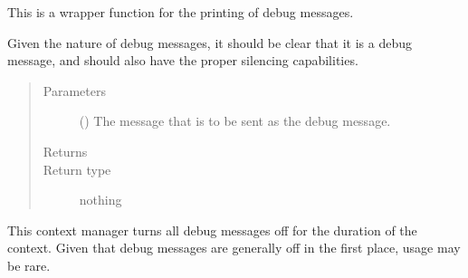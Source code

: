 \documentclass[letterpaper,10pt,english]{sphinxmanual}
\begin{document}

\begin{fulllineitems}
\label{\detokenize{python_docstrings/IfA_Smeargle.meta.errors:IfA_Smeargle.meta.errors.smeargle_debug_message}}
This is a wrapper function for the printing of debug messages.

Given the nature of debug messages, it should be clear that it is a debug
message, and should also have the proper silencing capabilities.
\begin{quote}\begin{description}
\item[{Parameters}] \leavevmode
{} () \textendash{} The message that is to be sent as the debug message.

\item[{Returns}] \leavevmode


\item[{Return type}] \leavevmode
nothing

\end{description}\end{quote}

\end{fulllineitems}


\begin{fulllineitems}
\label{\detokenize{python_docstrings/IfA_Smeargle.meta.errors:IfA_Smeargle.meta.errors.smeargle_disable_debug}}
This context manager turns all debug messages off for the duration of
the context. Given that debug messages are generally off in the first
place, usage may be rare.

\end{fulllineitems}

\end{document}
